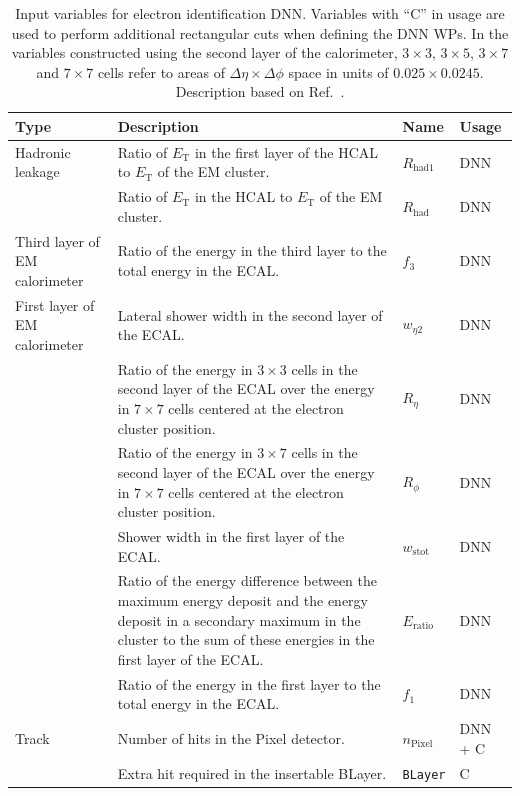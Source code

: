 \clearpage
{\scriptsize
\begin{longtable}{p{2.3cm}p{6.5cm}p{1.8cm}p{1.8cm}}
  \caption{Input variables for electron identification DNN. Variables with ``C'' in usage are used to perform additional rectangular cuts when defining the DNN WPs. In the variables constructed using the second layer of the calorimeter, $3\times3$, $3\times5$, $3\times7$ and $7\times7$ cells refer to areas of $\Delta \eta \times \Delta \phi$ space in units of $0.025\times0.0245$. Description based on Ref.~\cite{dnn_paper}.}\\
  \toprule
  \textbf{Type} & \textbf{Description} & \textbf{Name} & \textbf{Usage} \\
  \midrule
  \endfirsthead
  \midrule
  \endhead
  Hadronic leakage & Ratio of $E_{\text{T}}$ in the first layer of the HCAL to $E_{\text{T}}$ of the EM cluster. & $R_{\text{had1}}$ & DNN \\
   & Ratio of $E_{\text{T}}$ in the HCAL to $E_{\text{T}}$ of the EM cluster. & $R_{\text{had}}$ & DNN \\
  \midrule
  Third layer of EM calorimeter & Ratio of the energy in the third layer to the total energy in the ECAL. & $f_3$ & DNN \\
  \midrule
  First layer of EM calorimeter & Lateral shower width in the second layer of the ECAL. & $w_{\eta2}$ & DNN \\
   & Ratio of the energy in $3{\times}3$ cells in the second layer of the ECAL over the energy in $7{\times}7$ cells centered at the electron cluster position. & $R_{\eta}$ & DNN \\
   & Ratio of the energy in $3{\times}7$ cells in the second layer of the ECAL over the energy in $7{\times}7$ cells centered at the electron cluster position. & $R_{\phi}$ & DNN \\
   & Shower width in the first layer of the ECAL. & $w_{\text{stot}}$ & DNN\\
   & Ratio of the energy difference between the maximum energy deposit and the energy deposit in a secondary maximum in the cluster to the sum of these energies in the first layer of the ECAL. & $E_{\text{ratio}}$ & DNN \\
   & Ratio of the energy in the first layer to the total energy in the ECAL. & $f_1$ & DNN \\
  \midrule
  Track  & Number of hits in the Pixel detector. & $n_{\text{Pixel}}$ & DNN + C \\
   & Extra hit required in the insertable BLayer. & \texttt{BLayer} & C \\

\end{longtable}}
